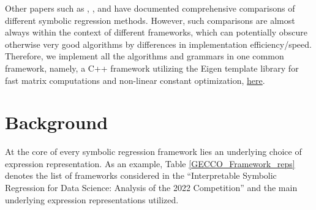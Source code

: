 \documentclass[runningheads]{llncs}
\begin{document}
\par Other papers such as \cite{lacava2021contemporary}, \cite{10.1145/3205455.3205539}, and \cite{Zegklitz2021} have documented comprehensive comparisons of different symbolic regression methods. However, such comparisons are almost always within the context of different frameworks, which can potentially obscure otherwise very good algorithms by differences in implementation efficiency/speed. Therefore, we implement all the algorithms and grammars in one common framework, namely, a C++ framework utilizing the Eigen template library  \cite{eigenweb} for fast matrix computations and non-linear constant optimization, \href{https://github.com/edfink234/Alpha-Zero-Symbolic-Regression/tree/prefix_and_postfix_cpp_implementation}{here}.

 

\section{Background}\label{sec:Background}

At the core of every symbolic regression framework lies an underlying choice of expression representation.
As an example, Table \ref {GECCO_Framework_reps} denotes the list of frameworks considered in the ``Interpretable Symbolic Regression for Data Science: Analysis of the 2022 Competition'' \cite{defranca2023interpretable} and the main underlying expression representations utilized. 
\end{document}
